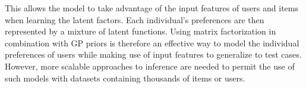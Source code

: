 This allows the model to take advantage of the input features of
users and items when learning the latent factors. 
Each individual's preferences are then represented 
by a mixture of latent functions.
Using matrix factorization in combination with GP priors is therefore an effective
way to model the individual preferences of users while
making use of input features to generalize to test cases. However,
more scalable approaches to inference are needed to permit the use of such 
models with datasets containing thousands of items or users.



